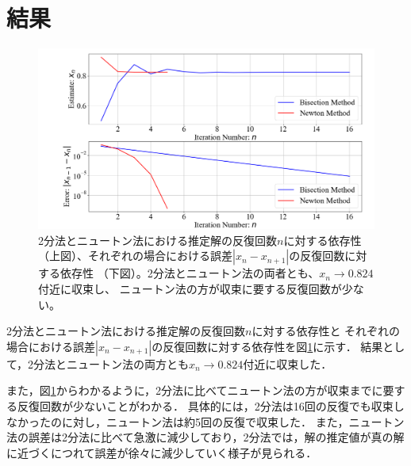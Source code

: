 \documentclass[uplatex]{jsarticle}
\begin{document}
\section{結果}
\begin{figure}[H]
	\centering
	\includegraphics[width=12cm]{./Figs/Figure_1.png}
	\caption{2分法とニュートン法における推定解の反復回数$n$に対する依存性
	（上図）、それぞれの場合における誤差$|x_n−x_{n+1}|$の反復回数に対する依存性
	（下図）。2分法とニュートン法の両者とも、$x_n → 0.824$付近に収束し、
	ニュートン法の方が収束に要する反復回数が少ない。}
    \label{fig:2}
\end{figure}

\indent
2分法とニュートン法における推定解の反復回数$n$に対する依存性と
それぞれの場合における誤差$|x_n−x_{n+1}|$の反復回数に対する依存性を図\ref{fig:2}に示す．
結果として，2分法とニュートン法の両方とも$x_n→0.824$付近に収束した．
\par
また，図\ref{fig:2}からわかるように，2分法に比べてニュートン法の方が収束までに要する反復回数が少ないことがわかる．
具体的には，2分法は16回の反復でも収束しなかったのに対し，ニュートン法は約5回の反復で収束した．
また，ニュートン法の誤差は2分法に比べて急激に減少しており，2分法では，解の推定値が真の解に近づくにつれて誤差が徐々に減少していく様子が見られる．
\par
\end{document}

